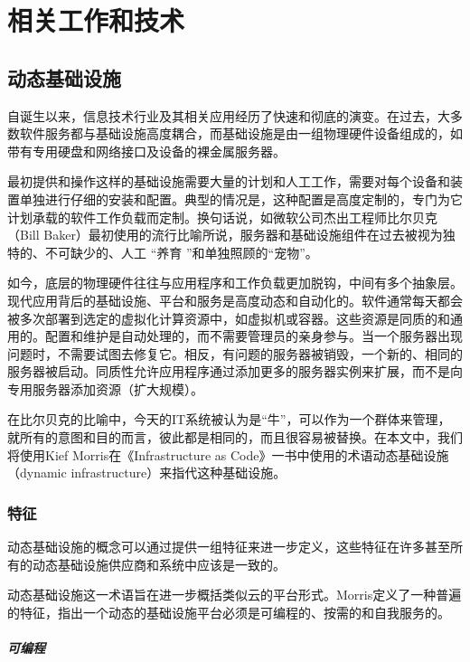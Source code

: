 \documentclass[macfonts,master]{njuthesis}
\begin{document}
\chapter{相关工作和技术}\label{chapter_relative}
\section{动态基础设施}

自诞生以来，信息技术行业及其相关应用经历了快速和彻底的演变。在过去，大多数软件服务都与基础设施高度耦合，而基础设施是由一组物理硬件设备组成的，如带有专用硬盘和网络接口及设备的裸金属服务器。

最初提供和操作这样的基础设施需要大量的计划和人工工作，需要对每个设备和装置单独进行仔细的安装和配置。典型的情况是，这种配置是高度定制的，专门为它计划承载的软件工作负载而定制\cite{morris2016infrastructure}。换句话说，如微软公司杰出工程师比尔贝克（Bill Baker）最初使用的流行比喻\cite{scalingsqlserver}所说，服务器和基础设施组件在过去被视为独特的、不可缺少的、人工 ``养育 ''和单独照顾的``宠物''。

如今，底层的物理硬件往往与应用程序和工作负载更加脱钩，中间有多个抽象层。现代应用背后的基础设施、平台和服务是高度动态和自动化的。软件通常每天都会被多次部署到选定的虚拟化计算资源中，如虚拟机或容器。这些资源是同质的和通用的\cite{morris2016infrastructure}。配置和维护是自动处理的，而不需要管理员的亲身参与。当一个服务器出现问题时，不需要试图去修复它。相反，有问题的服务器被销毁，一个新的、相同的服务器被启动。同质性允许应用程序通过添加更多的服务器实例来扩展，而不是向专用服务器添加资源（扩大规模）\cite{morris2016infrastructure}。

在比尔贝克的比喻中，今天的IT系统被认为是``牛''，可以作为一个群体来管理，就所有的意图和目的而言，彼此都是相同的，而且很容易被替换。在本文中，我们将使用Kief Morris在《Infrastructure as Code》一书中使用的术语动态基础设施（dynamic infrastructure）来指代这种基础设施\cite{morris2016infrastructure}。

\subsection{特征}

动态基础设施的概念可以通过提供一组特征来进一步定义，这些特征在许多甚至所有的动态基础设施供应商和系统中应该是一致的。

动态基础设施这一术语旨在进一步概括类似云的平台形式。Morris定义了一种普遍的特征，指出一个动态的基础设施平台必须是可编程的、按需的和自我服务的\cite{morris2016infrastructure}。

\paragraph{可编程}
\end{document}
